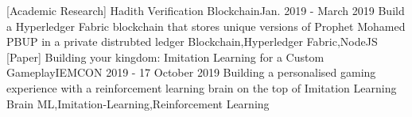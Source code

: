 

\begin{projects}
	


		\project
	{[Academic Research] Hadith Verification Blockchain}{Jan. 2019 - March 2019}
	{}
	{Build a Hyperledger Fabric blockchain that stores unique versions of Prophet Mohamed PBUP in a private distrubted ledger }
	{Blockchain,Hyperledger Fabric,NodeJS}	
			\project
	{[Paper] Building your kingdom: Imitation Learning for a Custom Gameplay}{IEMCON 2019 - 17 October 2019}
	{\paperSymbol{ }
	}
	{Building a personalised gaming experience with a reinforcement learning brain on the top of Imitation Learning Brain}
	{ML,Imitation-Learning,Reinforcement Learning}
\end{projects}